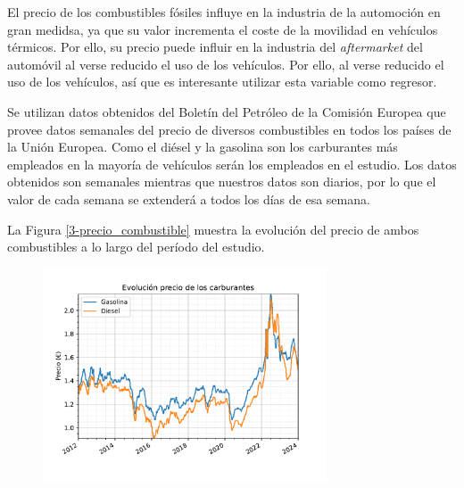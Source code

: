 El precio de los combustibles fósiles influye en la industria de la automoción en gran medidsa, ya que su valor incrementa el coste de la movilidad en vehículos térmicos. Por ello, su precio puede influir en la industria del \textit{aftermarket} del automóvil al verse reducido el uso de los vehículos. Por ello, al verse reducido el uso de los vehículos, así que es interesante utilizar esta variable como regresor.

Se utilizan datos obtenidos del Boletín del Petróleo de la Comisión Europea \cite{petrol} que provee datos semanales del precio de diversos combustibles en todos los países de la Unión Europea. Como el diésel y la gasolina son los carburantes más empleados en la mayoría de vehículos serán los empleados en el estudio. Los datos obtenidos son semanales mientras que nuestros datos son diarios, por lo que el valor de cada semana se extenderá a todos los días de esa semana. 

La Figura \ref*{3-precio_combustible} muestra la evolución del precio de ambos combustibles a lo largo del período del estudio.

\begin{figure}[H]
	{\includegraphics[width=0.75\textwidth]{imagenes/grafica_carburantes.pdf}}
\end{figure}
